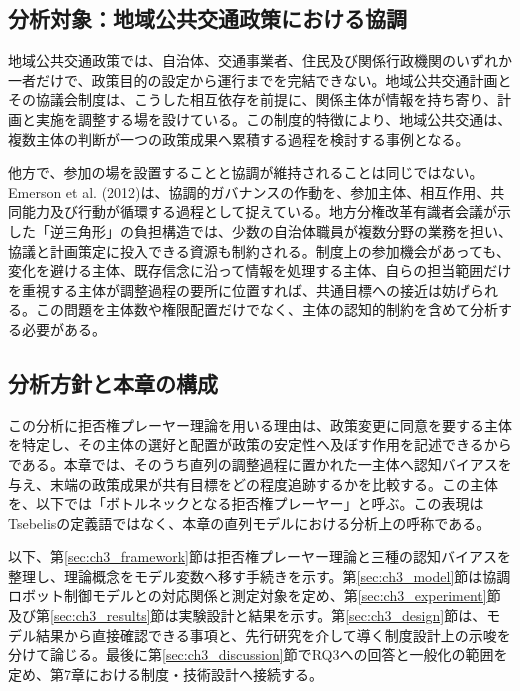 \subsection{分析対象：地域公共交通政策における協調}

地域公共交通政策では、自治体、交通事業者、住民及び関係行政機関のいずれか一者だけで、政策目的の設定から運行までを完結できない。地域公共交通計画とその協議会制度は、こうした相互依存を前提に、関係主体が情報を持ち寄り、計画と実施を調整する場を設けている\cite{mlit2022}。この制度的特徴により、地域公共交通は、複数主体の判断が一つの政策成果へ累積する過程を検討する事例となる。

他方で、参加の場を設置することと協調が維持されることは同じではない。Emerson et al. (2012)は、協調的ガバナンスの作動を、参加主体、相互作用、共同能力及び行動が循環する過程として捉えている\cite{emerson2012integrative}。地方分権改革有識者会議が示した「逆三角形」の負担構造では、少数の自治体職員が複数分野の業務を担い、協議と計画策定に投入できる資源も制約される\cite{chihou2022}。制度上の参加機会があっても、変化を避ける主体、既存信念に沿って情報を処理する主体、自らの担当範囲だけを重視する主体が調整過程の要所に位置すれば、共通目標への接近は妨げられる。この問題を主体数や権限配置だけでなく、主体の認知的制約を含めて分析する必要がある。

\subsection{分析方針と本章の構成}

この分析に拒否権プレーヤー理論を用いる理由は、政策変更に同意を要する主体を特定し、その主体の選好と配置が政策の安定性へ及ぼす作用を記述できるからである\cite{tsebelis2002veto}。本章では、そのうち直列の調整過程に置かれた一主体へ認知バイアスを与え、末端の政策成果が共有目標をどの程度追跡するかを比較する。この主体を、以下では「ボトルネックとなる拒否権プレーヤー」と呼ぶ。この表現はTsebelisの定義語ではなく、本章の直列モデルにおける分析上の呼称である。

以下、第\ref{sec:ch3_framework}節は拒否権プレーヤー理論と三種の認知バイアスを整理し、理論概念をモデル変数へ移す手続きを示す。第\ref{sec:ch3_model}節は協調ロボット制御モデルとの対応関係と測定対象を定め、第\ref{sec:ch3_experiment}節及び第\ref{sec:ch3_results}節は実験設計と結果を示す。第\ref{sec:ch3_design}節は、モデル結果から直接確認できる事項と、先行研究を介して導く制度設計上の示唆を分けて論じる。最後に第\ref{sec:ch3_discussion}節でRQ3への回答と一般化の範囲を定め、第7章における制度・技術設計へ接続する。

